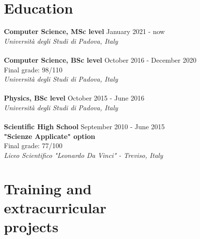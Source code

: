 \documentclass[margin, 10pt]{res}
\begin{document}
\begin{resume}
\section{Education}
\textbf{Computer Science, MSc level} \hfill January 2021 - now \\
\textit{Università degli Studi di Padova, Italy} \\ \\
\textbf{Computer Science, BSc level} \hfill October 2016 - December 2020 \\
Final grade: 98/110 \\
\textit{Università degli Studi di Padova, Italy} \\ \\
\textbf{Physics, BSc level} \hfill October 2015 - June 2016 \\
\textit{Università degli Studi di Padova, Italy} \\ \\
\textbf{Scientific High School} \hfill September 2010 - June 2015 \\
\textbf{"Scienze Applicate" option} \\
Final grade: 77/100 \\
\textit{Liceo Scientifico "Leonardo Da Vinci" - Treviso, Italy} 


\section{Training and\\ extracurricular \\ projects}


\end{resume}
\end{document}
